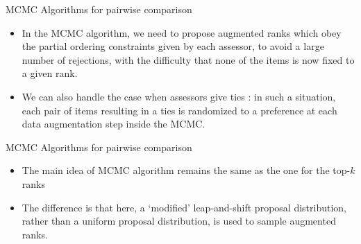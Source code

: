 \documentclass[11pt]{beamer}
\begin{document}
\begin{frame}{MCMC Algorithms for pairwise comparison}
\begin{itemize}
    \item In the MCMC algorithm, we need to propose augmented ranks which obey the partial ordering constraints given by each assessor, to avoid a large number of rejections, with the difficulty that none of the items is now fixed to a given rank.
    \item We can also handle the case when assessors give ties : in such a situation, each pair of items resulting in a ties is randomized to a preference at each data augmentation step inside the MCMC.
\end{itemize}
\end{frame}

\begin{frame}{MCMC Algorithms for pairwise comparison}
\begin{itemize}
    \item The main idea of MCMC algorithm remains the same as the one for the top-$k$ ranks
    \item The difference is that here, a `modified' leap-and-shift proposal distribution, rather than a uniform proposal distribution, is used to sample augmented ranks.
\end{itemize}
\end{frame}
\end{document}
